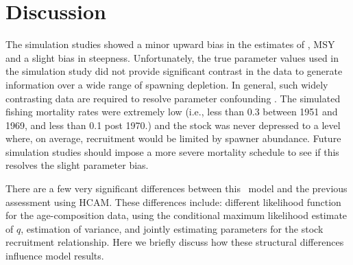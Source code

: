 
\section{Discussion}



The simulation studies showed a minor upward bias in the estimates of \fmsy, MSY and a slight bias in steepness.  Unfortunately, the true parameter values used in the simulation study did not provide significant contrast in the data to generate information over a wide range of spawning depletion.  In general, such widely contrasting data are required to resolve parameter confounding \citep{hilborn1992quantitative}.  The simulated fishing mortality rates were extremely low (i.e., less than 0.3 between 1951 and 1969, and less than 0.1 post 1970.) and the stock was never depressed to a level where, on average, recruitment would be limited by spawner abundance.  Future simulation studies should impose a more severe mortality schedule to see if this resolves the slight parameter bias.

There are a few very significant differences between this \iscam\ model and the previous assessment using HCAM. These differences include: different likelihood function for the age-composition data, using the conditional maximum likelihood estimate of $q$, estimation of variance, and jointly estimating parameters for the stock recruitment relationship.  Here we briefly discuss how these structural differences influence model results.

